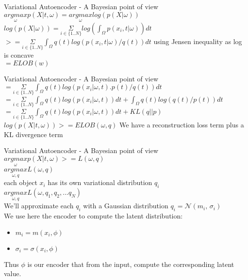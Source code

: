 \documentclass{beamer}
\begin{document}
\begin{frame}{Variational Autoencoder - A Bayesian point of view}
	$\underset{\omega}{argmax} p(X|t, \omega) = \underset{\omega}{argmax} log(p(X| \omega))$ \\
	$ log(p(X| \omega)) = \underset{i \in \{1..N\}}{\Sigma} log( \int_\Omega p(x_i, t | \omega))dt$ \\ 
	$ >= \underset{i \in \{1..N\}}{\Sigma} \int_\Omega q(t) log( p(x_i, t | \omega)/q(t))dt$ using Jensen inequality as log is concave\\
	$ = ELOB(w)$ \\
\end{frame}
\begin{frame}{Variational Autoencoder - A Bayesian point of view}
	$ = \underset{i \in \{1..N\}}{\Sigma} \int_\Omega q(t) log( p(x_i | \omega, t).p(t)/q(t))dt$ \\
	$ = \underset{i \in \{1..N\}}{\Sigma} \int_\Omega q(t) log( p(x_i | \omega, t))dt + \int_\Omega q(t)log(q(t)/p(t)) dt$ \\
	$ = \underset{i \in \{1..N\}}{\Sigma} \int_\Omega q(t) log( p(x_i | \omega, t))dt + KL( q || p) $ \\
	$ log(p(X|t, \omega)) >= ELOB(\omega,q) $
	We have a reconstruction loss term plus a KL divergence term
\end{frame}

\begin{frame}{Variational Autoencoder - A Bayesian point of view}
	$ \underset{\omega}{argmax} p(X|t, \omega) >= L(\omega,q) $ \\
        $ \underset{\omega,q}{argmax} L(\omega,q) $ \\
	each object $x_i$ has its own variational distribution $q_i$ \\
        $ \underset{\omega,q}{argmax} L(\omega,q_1, q_2, ... q_N) $ \\
	We'll approximate each $q_i$ with a Gaussian distribution $q_i = \mathcal{N}(m_i,\,\sigma_i)$ \\
	We use here the encoder to compute the latent distribution: \\
	\begin{itemize}
		\item $m_i = m(x_i, \phi)$
		\item $\sigma_i = \sigma(x_i, \phi)$
	\end{itemize}
	Thus $\phi$ is our encoder that from the input, compute the corresponding latent value.
\end{frame}
\end{document}
